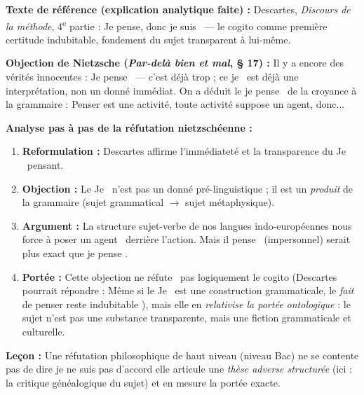 \documentclass[11pt]{article}
\newcommand{\cle}[1]{{\popxbold\color{popdark}#1}}
\begin{document}
\begin{experience}
\textbf{Texte de référence (explication analytique faite) :} Descartes, \emph{Discours de la méthode}, 4\textsuperscript{e} partie : \guillemotleft Je pense, donc je suis \guillemotright\ — le \cle{cogito} comme première certitude indubitable, fondement du sujet transparent à lui-même.

\textbf{Objection de Nietzsche (\emph{Par-delà bien et mal}, § 17) :}
\guillemotleft Il y a encore des vérités innocentes : \guillemotleft Je pense \guillemotright\ — c'est déjà trop ; ce \guillemotleft je \guillemotright\ est déjà une interprétation, non un donné immédiat. On a déduit le \guillemotleft je pense \guillemotright\ de la croyance à la grammaire : \guillemotleft Penser est une activité, toute activité suppose un agent, donc... \guillemotright\ \guillemotright

\textbf{Analyse pas à pas de la réfutation nietzschéenne :}
\begin{enumerate}
    \item \textbf{Reformulation :} Descartes affirme l'immédiateté et la transparence du \guillemotleft Je \guillemotright\ pensant.
    \item \textbf{Objection :} Le \guillemotleft Je \guillemotright\ n'est pas un donné pré-linguistique ; il est un \emph{produit} de la grammaire (sujet grammatical $\rightarrow$ sujet métaphysique).
    \item \textbf{Argument :} La structure sujet-verbe de nos langues indo-européennes nous force à poser un \guillemotleft agent \guillemotright\ derrière l'action. Mais \guillemotleft il pense \guillemotright\ (impersonnel) serait plus exact que \guillemotleft je pense \guillemotright.
    \item \textbf{Portée :} Cette objection ne \guillemotleft réfute \guillemotright\ pas logiquement le cogito (Descartes pourrait répondre : \guillemotleft Même si le \guillemotleft Je \guillemotright\ est une construction grammaticale, le \emph{fait} de penser reste indubitable \guillemotright), mais elle en \emph{relativise la portée ontologique} : le sujet n'est pas une substance transparente, mais une fiction grammaticale et culturelle.
\end{enumerate}
\textbf{Leçon :} Une réfutation philosophique de haut niveau (niveau Bac) ne se contente pas de dire \guillemotleft je ne suis pas d'accord \guillemotright\; elle articule une \emph{thèse adverse structurée} (ici : la critique généalogique du sujet) et en mesure la portée exacte.
\end{experience}
\end{document}
